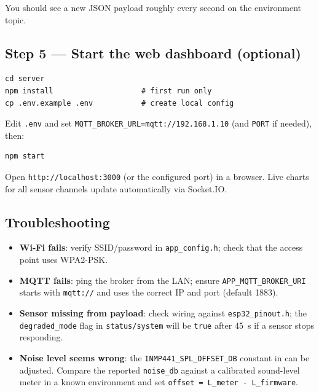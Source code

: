\documentclass[11pt,a4paper]{article}
\begin{document}
You should see a new JSON payload roughly every second on the environment topic.

\subsection{Step 5 --- Start the web dashboard (optional)}

\begin{verbatim}
cd server
npm install                    # first run only
cp .env.example .env           # create local config
\end{verbatim}

Edit \texttt{.env} and set \texttt{MQTT\_BROKER\_URL=mqtt://192.168.1.10} (and
\texttt{PORT} if needed), then:

\begin{verbatim}
npm start
\end{verbatim}

Open \texttt{http://localhost:3000} (or the configured port) in a browser. Live charts for all
sensor channels update automatically via Socket.IO.

\subsection{Troubleshooting}

\begin{itemize}[leftmargin=*]
    \item \textbf{Wi-Fi fails}: verify SSID/password in \texttt{app\_config.h}; check that the
          access point uses WPA2-PSK.
    \item \textbf{MQTT fails}: ping the broker from the LAN; ensure \texttt{APP\_MQTT\_BROKER\_URI}
          starts with \texttt{mqtt://} and uses the correct IP and port (default 1883).
    \item \textbf{Sensor missing from payload}: check wiring against \texttt{esp32\_pinout.h};
          the \texttt{degraded\_mode} flag in \texttt{status/system} will be \texttt{true}
          after 45~s if a sensor stops responding.
    \item \textbf{Noise level seems wrong}: the \texttt{INMP441\_SPL\_OFFSET\_DB} constant in
          \texttt{} can be adjusted. Compare the reported
          \texttt{noise\_db} against a calibrated sound-level meter in a known environment and
          set \texttt{offset = L\_meter - L\_firmware}.
\end{itemize}
\end{document}
